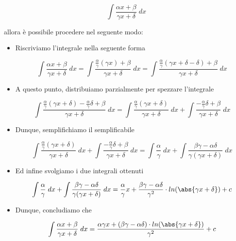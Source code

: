 \documentclass[a4paper, 12pt]{report}
\begin{document}
\begin{enumerate}
            \[ \int \frac{\alpha x + \beta}{\gamma x + \delta} \; dx\]
            
            allora è possibile procedere nel seguente modo:
            
            \begin{itemize}
                \item Riscriviamo l'integrale nella seguente forma
                
                \[ \int \frac{\alpha x + \beta}{\gamma x + \delta} \; dx = \int \frac{\frac{\alpha}{\gamma} (\gamma x) + \beta}{\gamma x + \delta} \; dx = \int \frac{\frac{\alpha}{\gamma} (\gamma x + \delta - \delta) + \beta}{\gamma x + \delta} \; dx \]
                
                \item A questo punto, distribuiamo parzialmente per spezzare l'integrale
                
                \[ \int \frac{\frac{\alpha}{\gamma} (\gamma x + \delta) - \frac{\alpha}{\gamma} \delta +  \beta}{\gamma x + \delta} \; dx =
                \int \frac{\frac{\alpha}{\gamma} (\gamma x + \delta)}{\gamma x + \delta} \; dx + \int \frac{-\frac{\alpha}{\gamma} \delta +  \beta}{\gamma x + \delta} \; dx \]
                
                \item Dunque, semplifichiamo il semplificabile
                
                \[ \int \frac{\frac{\alpha}{\gamma} (\gamma x + \delta)}{\gamma x + \delta} \; dx + \int \frac{-\frac{\alpha}{\gamma} \delta +  \beta}{\gamma x + \delta} \; dx = \int \frac{\alpha}{\gamma} \; dx + \int \frac{\beta \gamma - \alpha \delta}{\gamma ( \gamma x + \delta)} \; dx\]
                
                \item Ed infine svolgiamo i due integrali ottenuti
                
                \[ \int \frac{\alpha}{\gamma} \; dx + \int \frac{\beta \gamma - \alpha \delta}{\gamma ( \gamma x + \delta)} \; dx = \frac{\alpha}{\gamma} x + \frac{\beta \gamma - \alpha \delta}{\gamma^2} \cdot ln(\abs{\gamma x + \delta})+c\]
                
                \item Dunque, concludiamo che
                
                \[ \int \frac{\alpha x + \beta}{\gamma x + \delta} \; dx = \frac{\alpha \gamma x + (\beta \gamma - \alpha \delta) \cdot ln(\abs{\gamma x + \delta})}{\gamma^2}+c\]
            \end{itemize}
            

\end{enumerate}
\end{document}

